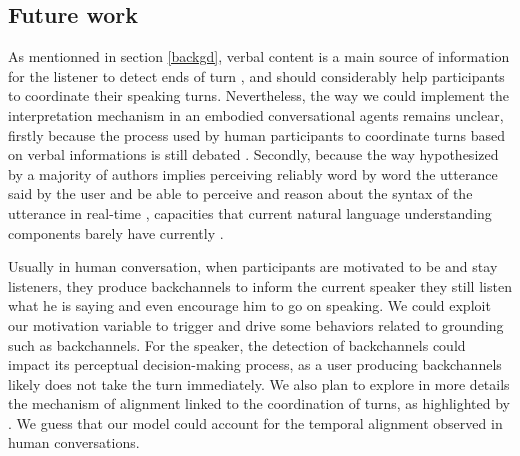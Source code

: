 \subsection{Future work}

As mentionned in section \ref{backgd}, verbal content is a main source of information for the listener to detect ends of turn \cite{de_ruiter_projecting_2006}, and should considerably help participants to coordinate their speaking turns. Nevertheless, the way we could implement the interpretation mechanism in an embodied conversational agents remains unclear, firstly because the process used by human participants to coordinate turns based on verbal informations is still debated \citep{heldner_pauses_2010,magyari_prediction_2012,riest_anticipation_2015}. Secondly, because the way hypothesized by a majority of authors implies perceiving reliably word by word the utterance said by the user and be able to perceive and reason about the syntax of the utterance in real-time \citep{sacks_simplest_1974}, capacities that current natural language understanding components barely have currently  \cite{de_vault_incremental_2011}.

Usually in human conversation, when participants are motivated to be and stay listeners, they produce backchannels to inform the current speaker they still listen what he is saying and even encourage him to go on speaking. 
We could exploit our motivation variable to trigger and drive some behaviors related to grounding such as backchannels. 
For the speaker, the detection of backchannels could impact its perceptual decision-making process, as a user producing backchannels likely does not take the turn immediately.
We also plan to explore in more details the mechanism of alignment linked to the coordination of turns, as highlighted by \citep{benus_pragmatic_2011}.
We guess that our model could account for the temporal alignment observed in human conversations.  

